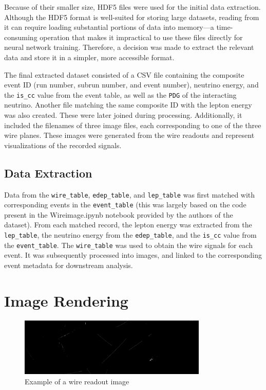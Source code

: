 \documentclass{pracalicmgr}
\begin{document}
Because of their smaller size, HDF5 files were used for the initial data extraction. Although the HDF5 format is well-suited for storing large datasets, reading from it can require loading substantial portions of data into memory—a time-consuming operation that makes it impractical to use these files directly for neural network training. Therefore, a decision was made to extract the relevant data and store it in a simpler, more accessible format.

The final extracted dataset consisted of a CSV file containing the composite event ID (run number, subrun number, and event number), neutrino energy, and the \texttt{is\_cc} value from the event table, as well as the \texttt{PDG} of the interacting neutrino. Another file matching the same composite ID with the lepton energy was also created. These were later joined during processing. Additionally, it included the filenames of three image files, each corresponding to one of the three wire planes. These images were generated from the wire readouts and represent visualizations of the recorded signals.

\subsection{Data Extraction}

Data from the \texttt{wire\_table}, \texttt{edep\_table}, and \texttt{lep\_table} was first matched with corresponding events in the \texttt{event\_table} (this was largely based on the code present in the Wireimage.ipynb notebook provided by the authors of the dataset). From each matched record, the lepton energy was extracted from the \texttt{lep\_table}, the neutrino energy from the \texttt{edep\_table}, and the \texttt{is\_cc} value from the \texttt{event\_table}. The \texttt{wire\_table} was used to obtain the wire signals for each event. It was subsequently processed into images, and linked to the corresponding event metadata for downstream analysis.

\section{Image Rendering}

\begin{figure}[H]
    \centering
    \includegraphics[width=0.8\textwidth]{src/with_flag_58.png}
    \caption{Example of a wire readout image}
\end{figure}
\end{document}

